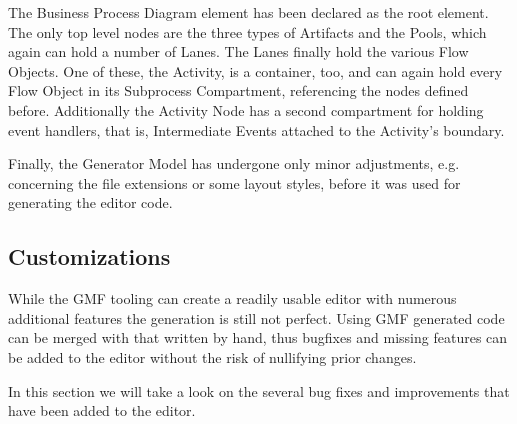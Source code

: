 The Business Process Diagram element has been declared as the root element. The only top level nodes are the three types of Artifacts and the Pools, which again can hold a number of Lanes. The Lanes finally hold the various Flow Objects. One of these, the Activity, is a container, too, and can again hold every Flow Object in its Subprocess Compartment, referencing the nodes defined before. Additionally the Activity Node has a second compartment for holding event handlers, that is, Intermediate Events attached to the Activity's boundary.

Finally, the Generator Model has undergone only minor adjustments, e.g. concerning the file extensions or some layout styles, before it was used for generating the editor code.


\subsection{Customizations}

While the GMF tooling can create a readily usable editor with numerous additional features the generation is still not perfect. Using GMF generated code can be merged with that written by hand, thus bugfixes and missing features can be added to the editor without the risk of nullifying prior changes. %

In this section we will take a look on the several bug fixes and improvements that have been added to the editor.

